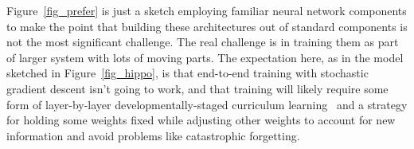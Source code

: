 \documentclass[letterpaper,11pt]{article}
\def\urlh#1{{}}
\begin{document}
Figure~{\urlh{#fig_Prefrontal_Hierarchy_Biology_Technology}{\ref{fig_prefer}}} is just a sketch employing familiar neural network components to make the point that building these architectures out of standard components is not the most significant challenge. The real challenge is in training them as part of larger system with lots of moving parts. The expectation here, as in the model sketched in Figure~{\urlh{#fig_Hippocampus_Inspired_Learning_Redux}{\ref{fig_hippo}}}, is that end-to-end training with stochastic gradient descent isn't going to work, and that training will likely require some form of layer-by-layer developmentally-staged curriculum learning~\cite{LampinenetalCoRR-19,GulcehreetalCoRR-16,BengioetalCoRR-15,BengioetalICML-09} and a strategy for holding some weights fixed while adjusting other weights to account for new information and avoid problems like catastrophic forgetting.


\end{document}
